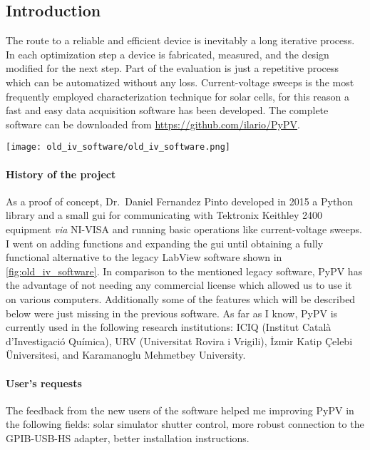 	\subsection{Introduction}
		The route to a reliable and efficient device is inevitably a long iterative process.
		In each optimization step a device is fabricated, measured, and the design modified for the next step.
		Part of the evaluation is just a repetitive process which can be automatized without any loss.
		Current-voltage sweeps is the most frequently employed characterization technique for solar cells, for this reason a fast and easy data acquisition software has been developed.
		The complete software can be downloaded from \url{https://github.com/ilario/PyPV}.

		\begin{SCfigure}%
			\centering
			\texttt{[image: old\_iv\_software/old\_iv\_software.png]}
			\label{fig:old_iv_software}
		\end{SCfigure}

		\paragraph{History of the project}
		As a proof of concept, Dr.\ Daniel Fernandez Pinto developed in 2015 a Python library and a small \gls{gui} for communicating with Tektronix Keithley 2400 equipment \textsl{via} NI-VISA \cite{NationalInstruments2019} and running basic operations like current\hyp{}voltage sweeps.
		I went on adding functions and expanding the \gls{gui} until obtaining a fully functional alternative to the legacy LabView software shown in \cref{fig:old_iv_software}.
		In comparison to the mentioned legacy software, PyPV has the advantage of not needing any commercial license which allowed us to use it on various computers.
		Additionally some of the features which will be described below were just missing in the previous software.
		As far as I know, PyPV is currently used in the following research institutions: ICIQ (Institut Català d’Investigació Química), URV (Universitat Rovira i Vrigili), İzmir Katip Çelebi Üniversitesi, and Karamanoglu Mehmetbey University.


		\paragraph{User's requests}
		The feedback from the new users of the software helped me improving PyPV in the following fields: solar simulator shutter control, more robust connection to the GPIB-USB-HS adapter, better installation instructions.

